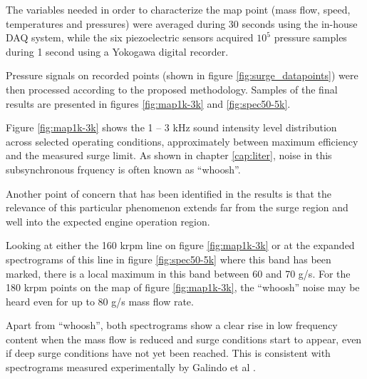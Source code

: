 The variables needed in order to characterize the map point (mass flow, speed, temperatures and pressures) were averaged during 30 seconds using the in-house DAQ system, while the six piezoelectric sensors acquired $10^5$ pressure samples during 1 second using a Yokogawa digital recorder.

Pressure signals on recorded points (shown in figure \ref{fig:surge_datapoints}) were then processed according to the proposed methodology. Samples of the final results are presented in figures \ref{fig:map1k-3k} and \ref{fig:spec50-5k}.

Figure \ref{fig:map1k-3k} shows the 1 -- 3 kHz sound intensity level distribution across selected operating conditions, approximately between maximum efficiency and the measured surge limit. As shown in chapter \ref{cap:liter}, noise in this subsynchronous frquency is often known as ``whoosh''.

Another point of concern that has been identified in the results is that the relevance of this particular phenomenon extends far from the surge region and well into the expected engine operation region.

Looking at either the 160 krpm line on figure \ref{fig:map1k-3k} or at the expanded spectrograms of this line in figure \ref{fig:spec50-5k} where this band has been marked, there is a local maximum in this band between 60 and 70 g/s. For the 180 krpm points on the map of figure \ref{fig:map1k-3k}, the ``whoosh'' noise may be heard even for up to 80 g/s mass flow rate.

Apart from ``whoosh'', both spectrograms show a clear rise in low frequency content when the mass flow is reduced and surge conditions start to appear, even if deep surge conditions have not yet been reached. This is consistent with spectrograms measured experimentally by Galindo et al \cite{galindo2009effect}.


